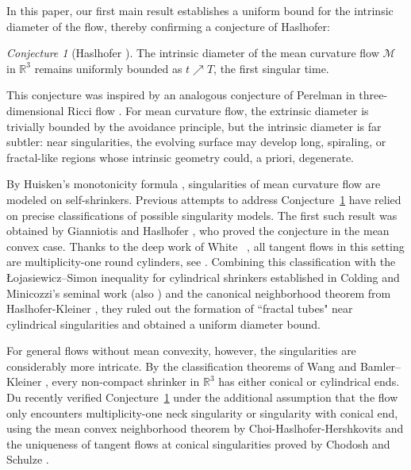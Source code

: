 \documentclass[11pt,reqno]{amsart}
\numberwithin{equation}{section}
\newcommand{\RR}{\mathds{R}}
\newcommand{\cM}{\mathcal{M}}
\theoremstyle{definition}
\theoremstyle{remark}
\theoremstyle{remark}
\theoremstyle{remark}
\theoremstyle{remark}\newtheorem{conjecture}[equation]{Conjecture}
\theoremstyle{remark}\newtheorem{question}[equation]{Question}
\begin{document}
In this paper, our first main result establishes a uniform bound for the intrinsic diameter of the flow, thereby confirming a conjecture of Haslhofer:

\begin{conjecture}[Haslhofer \cite{Has21,Has25}]\label{c:bound diam}
    The intrinsic diameter of the mean curvature flow $\cM$ in $\RR^3$ remains uniformly bounded as $t \nearrow T$, the first singular time. 
\end{conjecture}

This conjecture was inspired by an analogous conjecture of Perelman in three-dimensional Ricci flow \cite{Pe02}. For mean curvature flow, the extrinsic diameter is trivially bounded by the avoidance principle, but the intrinsic diameter is far subtler: near singularities, the evolving surface may develop long, spiraling, or fractal-like regions whose intrinsic geometry could, a priori, degenerate.

By Huisken’s monotonicity formula \cite{Hu90}, singularities of mean curvature flow are modeled on self-shrinkers. Previous attempts to address Conjecture~\ref{c:bound diam} have relied on precise classifications of possible singularity models. The first such result was obtained by Gianniotis and Haslhofer \cite{GH20}, who proved the conjecture in the mean convex case. Thanks to the deep work of White ~\cite{Wh00,Wh03}, all tangent flows in this setting are multiplicity-one round cylinders, see \cite{Hu93,HS99a,HS99b,SW09,An12,CM12,HK17a}. Combining this classification with the Łojasiewicz–Simon inequality for cylindrical shrinkers established in Colding and Minicozzi's seminal work \cite{CM15} (also \cite{CIM15}) and the canonical neighborhood theorem from Haslhofer-Kleiner \cite{HK17a,HK17b}, they ruled out the formation of “fractal tubes" near cylindrical singularities and obtained a uniform diameter bound.

For general flows without mean convexity, however, the singularities are considerably more intricate. By the classification theorems of Wang \cite{Wa16b} and Bamler–Kleiner \cite{BK23}, every non-compact shrinker in $\mathbb{R}^3$ has either conical or cylindrical ends. Du \cite{Du21} recently verified Conjecture~\ref{c:bound diam} under the additional assumption that the flow only encounters multiplicity-one neck singularity or singularity with conical end, using the mean convex neighborhood theorem by Choi-Haslhofer-Hershkovits \cite{CHH22} and the uniqueness of tangent flows at conical singularities proved by Chodosh and Schulze \cite{CS21}.
\end{document}
